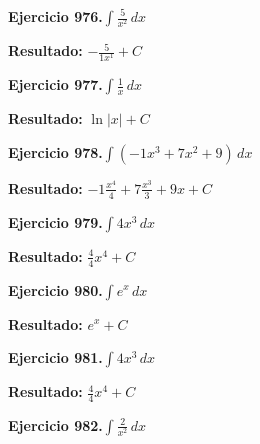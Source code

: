 \documentclass[10pt,a4paper]{article}
\begin{document}
\newpage
\begin{ejbox}
\textbf{Ejercicio 976.}\quad $\int \frac{5}{x^{2}}\,dx$
\end{ejbox}

\begin{solbox}
\textbf{Resultado:} \(\displaystyle -\frac{5}{1x^{1}} + C\)
\end{solbox}

\begin{ejbox}
\textbf{Ejercicio 977.}\quad $\int \frac{1}{x}\,dx$
\end{ejbox}

\begin{solbox}
\textbf{Resultado:} \(\displaystyle \ln|x| + C\)
\end{solbox}

\begin{ejbox}
\textbf{Ejercicio 978.}\quad $\int (-1x^3 +7x^2 +9)\,dx$
\end{ejbox}

\begin{solbox}
\textbf{Resultado:} \(\displaystyle -1\frac{x^4}{4} +7\frac{x^3}{3} +9x + C\)
\end{solbox}

\newpage
\begin{ejbox}
\textbf{Ejercicio 979.}\quad $\int 4x^{3}\,dx$
\end{ejbox}

\begin{solbox}
\textbf{Resultado:} \(\displaystyle \frac{4}{4}x^{4} + C\)
\end{solbox}

\begin{ejbox}
\textbf{Ejercicio 980.}\quad $\int e^x\,dx$
\end{ejbox}

\begin{solbox}
\textbf{Resultado:} \(\displaystyle e^x + C\)
\end{solbox}

\begin{ejbox}
\textbf{Ejercicio 981.}\quad $\int 4x^{3}\,dx$
\end{ejbox}

\begin{solbox}
\textbf{Resultado:} \(\displaystyle \frac{4}{4}x^{4} + C\)
\end{solbox}

\newpage
\begin{ejbox}
\textbf{Ejercicio 982.}\quad $\int \frac{2}{x^{2}}\,dx$
\end{ejbox}
\end{document}
